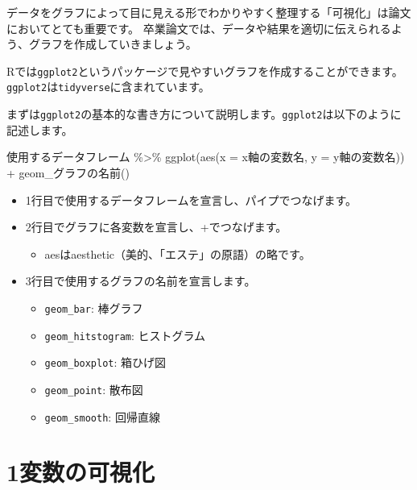 \documentclass[
]{book}
\newenvironment{Shaded}{\begin{snugshade}}{\end{snugshade}}
\newcommand{\AttributeTok}[1]{\textcolor[rgb]{0.77,0.63,0.00}{#1}}
\newcommand{\FunctionTok}[1]{\textcolor[rgb]{0.00,0.00,0.00}{#1}}
\newcommand{\NormalTok}[1]{#1}
\newcommand{\SpecialCharTok}[1]{\textcolor[rgb]{0.00,0.00,0.00}{#1}}
\providecommand{\tightlist}{%
  \setlength{\itemsep}{0pt}\setlength{\parskip}{0pt}}
\begin{document}
データをグラフによって目に見える形でわかりやすく整理する「可視化」は論文においてとても重要です。
卒業論文では、データや結果を適切に伝えられるよう、グラフを作成していきましょう。

Rでは\texttt{ggplot2}というパッケージで見やすいグラフを作成することができます。
\texttt{ggplot2}は\texttt{tidyverse}に含まれています。

まずは\texttt{ggplot2}の基本的な書き方について説明します。\texttt{ggplot2}は以下のように記述します。

\begin{Shaded}
\begin{Highlighting}[]
\NormalTok{使用するデータフレーム }\SpecialCharTok{\%\textgreater{}\%}
  \FunctionTok{ggplot}\NormalTok{(}\FunctionTok{aes}\NormalTok{(}\AttributeTok{x =}\NormalTok{ x軸の変数名, }\AttributeTok{y =}\NormalTok{ y軸の変数名)) }\SpecialCharTok{+}
\NormalTok{  geom\_グラフの名前()}
\end{Highlighting}
\end{Shaded}

\begin{itemize}
\tightlist
\item
  1行目で使用するデータフレームを宣言し、パイプでつなげます。
\item
  2行目でグラフに各変数を宣言し、+でつなげます。

  \begin{itemize}
  \tightlist
  \item
    aesはaesthetic（美的、「エステ」の原語）の略です。
  \end{itemize}
\item
  3行目で使用するグラフの名前を宣言します。

  \begin{itemize}
  \tightlist
  \item
    \texttt{geom\_bar}: 棒グラフ
  \item
    \texttt{geom\_hitstogram}: ヒストグラム
  \item
    \texttt{geom\_boxplot}: 箱ひげ図
  \item
    \texttt{geom\_point}: 散布図
  \item
    \texttt{geom\_smooth}: 回帰直線
  \end{itemize}
\end{itemize}

\hypertarget{ux5909ux6570ux306eux53efux8996ux5316}{%
\section{1変数の可視化}\label{ux5909ux6570ux306eux53efux8996ux5316}}
\end{document}
